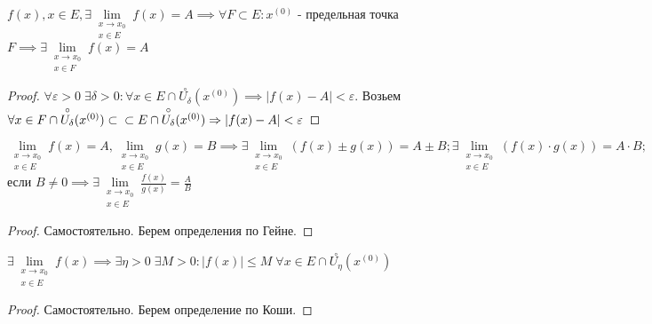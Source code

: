 \documentclass[../main.tex]{subfiles}
\begin{document}
\begin{theorem}
     $f(x),x\in E, \exists \lim\limits_{\substack{{x\to x_{0}}\\x\in E}}f(x) =A \implies \forall F \subset E: x^{(0)}$ - предельная точка $F\implies \exists \lim\limits_{\substack{{x\to x_{0}}\\ x\in F}}f(x)=A $
\end{theorem}
\begin{proof}
    $\forall \varepsilon>0 \; \exists \delta>0 : \forall x \in E \cap \overset{\circ}{U_{\delta}}(x^{(0)})\implies |f(x)-A|<\varepsilon$. Возьем $\forall x \in F \cap \overset{\circ}{U_{\delta}}(x^{(0)})\subset \\ \subset E \cap \overset{\circ}{U_{\delta}}(x^{(0)})\implies |f(x)-A| <\varepsilon$
\end{proof}
\begin{theorem}
    $\lim\limits_{\substack{x \to x_{0}\\x\in E}} f(x)=A , \lim\limits_{ \substack{x\to x_{0}\\x\in E}} g(x)=B  \implies \exists \lim\limits_{\substack{x\to x_{0}\\x\in E}} (f(x)\pm g(x))=A\pm B; \exists  \lim\limits_{\substack{x\to x_{0}\\x\in E}} (f(x)\cdot g(x))=A\cdot B;$ если $B\neq 0 \implies \exists \lim\limits_{\substack{x\to x_{0}\\ x\in E}} \frac{f(x)}{g(x)}=\frac{A}{B} $
\end{theorem}
\begin{proof}
    Самостоятельно. Берем определения по Гейне.
\end{proof}
\begin{theorem}
    $\exists \lim\limits_{\substack{x\to x_{0}\\ x\in E}} f(x) \implies \exists \eta > 0 \; \exists M>0: |f(x)| \leqslant M \; \forall x \in E \cap \overset{\circ}{U_{\eta}}(x^{(0)})$
\end{theorem}
\begin{proof}
    Самостоятельно. Берем определение по Коши.
\end{proof}
\end{document}
